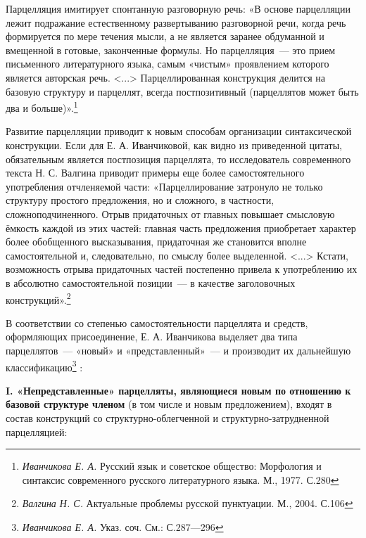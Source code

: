 \documentclass{kursa4}
\begin{document}
      {Парцелляция имитирует спонтанную разговорную речь: «В основе парцелляции лежит подражание естественному развертыванию разговорной речи, когда речь формируется по мере течения мысли, а не является заранее обдуманной и вмещенной в готовые, законченные формулы. Но парцелляция~--- это прием письменного литературного языка, самым «чистым» проявлением которого является авторская речь. \textless{}...\textgreater{} Парцеллированная конструкция делится на базовую структуру и парцеллят, }{всегда постпозитивный}{ (парцеллятов может быть два и больше)».}\footnote{\textit{{ Иванчикова Е. А. }}{Русский язык и советское общество: Морфология и синтаксис современного русского литературного языка. М., 1977.}\textit{{
      }}{С.280}}{ }

      {Развитие парцелляции приводит к новым способам организации синтаксической конструкции. Если для Е. А. Иванчиковой, как видно из приведенной цитаты, обязательным является постпозиция парцеллята, то исследователь современного текста Н. С. Валгина приводит примеры еще более самостоятельного употребления отчленяемой части: «Парцеллирование затронуло не только структуру простого предложения, но и сложного, в частности, сложноподчиненного. Отрыв придаточных от главных повышает смысловую ёмкость каждой из этих частей: главная часть предложения }{приобретает характер более обо}{б}{щенного высказывания, придаточная же становится вполне самостоятельной и, следовательно, по смыслу более выделенной. \textless{}...\textgreater{} Кстати, возможность отрыва придаточных частей постепенно привела к употреблению их в абсолютно самостоятельной позиции~--- в качестве заголовочных конструкций».}\footnote{\textit{{ Валгина Н. С. }}{Актуальные проблемы русской пунктуации. М., 2004. С.106}}{ }

      {В соответствии со степенью самостоятельности парцеллята и средств, оформляющих присоединение, Е. А. Иванчикова выделяет два типа парцеллятов~--- «новый» и «представленный»~--- и производит их дальнейшую классификацию}\footnote{\textit{{Иванчикова Е. А. }}{Указ. соч. См.: С.287—296}}{ :}

      \textbf{I. «Непредставленные» парцелляты, являющиеся новым по отношению к базовой структуре членом} (в том числе и новым предложением), входят в состав конструкций со структурно-облегченной и структурно-затрудненной парцелляцией:
\end{document}
